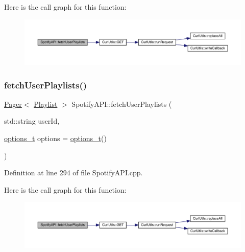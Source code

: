 Here is the call graph for this function\+:
\nopagebreak
\begin{figure}[H]
\begin{center}
\leavevmode
\includegraphics[width=350pt]{class_spotify_a_p_i_a79f8d10db209ef00b17c0e7e0df750e8_cgraph}
\end{center}
\end{figure}
\mbox{\label{class_spotify_a_p_i_a45c23825a41c89ff92fa1939fc0bfd76}} 
\subsubsection{\texorpdfstring{fetch\+User\+Playlists()}{fetchUserPlaylists()}\hspace{0.1cm}{\footnotesize\ttfamily [2/2]}}
{\footnotesize\ttfamily \mbox{\hyperlink{class_pager}{Pager}}$<$ \mbox{\hyperlink{class_playlist}{Playlist}} $>$ Spotify\+A\+P\+I\+::fetch\+User\+Playlists (\begin{DoxyParamCaption}\item[{std\+::string}]{user\+Id,  }\item[{\mbox{\hyperlink{_spotify_a_p_i_8h_a0ff5cac1a4007bb330b7d9939650c283}{options\+\_\+t}}}]{options = {\ttfamily \mbox{\hyperlink{_spotify_a_p_i_8h_a0ff5cac1a4007bb330b7d9939650c283}{options\+\_\+t}}()} }\end{DoxyParamCaption})}



Definition at line 294 of file Spotify\+A\+P\+I.\+cpp.

Here is the call graph for this function\+:
\nopagebreak
\begin{figure}[H]
\begin{center}
\leavevmode
\includegraphics[width=350pt]{class_spotify_a_p_i_a45c23825a41c89ff92fa1939fc0bfd76_cgraph}
\end{center}
\end{figure}
\mbox{\label{class_spotify_a_p_i_a0a22873540c42da1e98a573d34613852}} 
